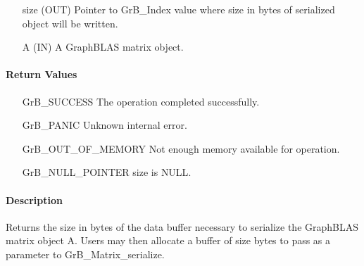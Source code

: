 \begin{itemize}[leftmargin=1.1in]
    \item[{\sf size}] ({\sf OUT}) Pointer to {\sf GrB\_Index} value where size in bytes of serialized object will be written.
    \item[{\sf A}]      ({\sf IN}) A GraphBLAS matrix object.
\end{itemize}

\paragraph{Return Values}

\begin{itemize}[leftmargin=2.3in]
    \item[{\sf GrB\_SUCCESS}]         The operation completed successfully.

    \item[{\sf GrB\_PANIC}]           Unknown internal error.
    
    \item[{\sf GrB\_OUT\_OF\_MEMORY}] Not enough memory available for operation.
    
    \item[{\sf GrB\_NULL\_POINTER}]  {\sf size} is {\sf NULL}.
\end{itemize}

\paragraph{Description}

Returns the size in bytes of the data buffer necessary to serialize the
GraphBLAS matrix object {\sf A}.  Users may then allocate a buffer of {\sf size}
bytes to pass as a parameter to {\sf GrB\_Matrix\_serialize}.
